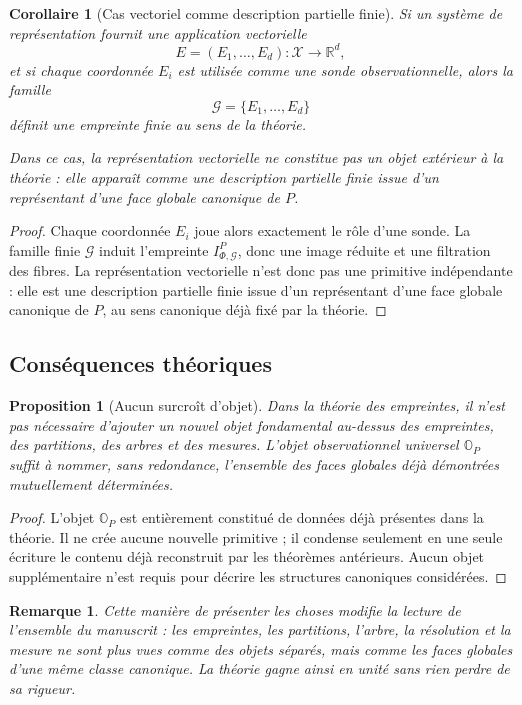\documentclass[11pt,a4paper]{article}
\newtheorem{proposition}{Proposition}
\newtheorem{corollary}{Corollaire}
\newtheorem{remark}{Remarque}
\begin{document}
\begin{appendices}
\begin{corollary}[Cas vectoriel comme description partielle finie]
Si un système de représentation fournit une application vectorielle
\[
E=(E_1,\ldots,E_d):\mathcal X\to\mathbb R^d,
\]
et si chaque coordonnée \(E_i\) est utilisée comme une sonde observationnelle, alors la famille
\[
\mathcal G=\{E_1,\ldots,E_d\}
\]
définit une empreinte finie au sens de la théorie.

Dans ce cas, la représentation vectorielle ne constitue pas un objet extérieur à la théorie : elle apparaît comme une description partielle finie issue d'un représentant d'une face globale canonique de \(P\).
\end{corollary}

\begin{proof}
Chaque coordonnée \(E_i\) joue alors exactement le rôle d'une sonde. La famille finie \(\mathcal G\) induit l'empreinte \(I_{\Phi,\mathcal G}^P\), donc une image réduite et une filtration des fibres. La représentation vectorielle n'est donc pas une primitive indépendante : elle est une description partielle finie issue d'un représentant d'une face globale canonique de \(P\), au sens canonique déjà fixé par la théorie.
\end{proof}

\subsection{Conséquences théoriques}

\begin{proposition}[Aucun surcroît d'objet]
Dans la théorie des empreintes, il n'est pas nécessaire d'ajouter un nouvel objet fondamental au-dessus des empreintes, des partitions, des arbres et des mesures. L'objet observationnel universel \(\mathbb O_P\) suffit à nommer, sans redondance, l'ensemble des faces globales déjà démontrées mutuellement déterminées.
\end{proposition}

\begin{proof}
L'objet \(\mathbb O_P\) est entièrement constitué de données déjà présentes dans la théorie. Il ne crée aucune nouvelle primitive ; il condense seulement en une seule écriture le contenu déjà reconstruit par les théorèmes antérieurs. Aucun objet supplémentaire n'est requis pour décrire les structures canoniques considérées.
\end{proof}

\begin{remark}
Cette manière de présenter les choses modifie la lecture de l'ensemble du manuscrit : les empreintes, les partitions, l'arbre, la résolution et la mesure ne sont plus vues comme des objets séparés, mais comme les faces globales d'une même classe canonique. La théorie gagne ainsi en unité sans rien perdre de sa rigueur.
\end{remark}


\end{appendices}
\end{document}
